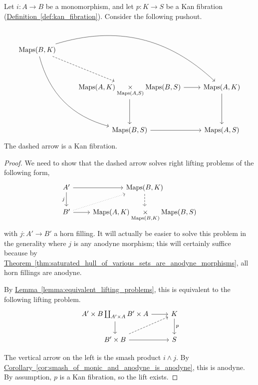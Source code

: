 \documentclass[main.tex]{subfiles}
\begin{document}
\begin{lemma}
  \label{lemma:kan_fibrations_preserved_under_dual_to_smash_product}
  Let $i\colon A \to B$ be a monomorphism, and let $p\colon K \to S$ be a Kan fibration (\hyperref[def:kan_fibration]{Definition~\ref*{def:kan_fibration}}). Consider the following pushout.
  \begin{equation*}
    \begin{tikzcd}[row sep=huge]
      \Maps(B, K)
      \arrow[rrd, bend left]
      \arrow[rdd, bend right]
      \arrow[rd, dashed]
      \\
      & \Maps(A, K) \underset{\Maps(A, S)}{\times} \Maps(B, S)
      \arrow[r]
      \arrow[d]
      & \Maps(A, K)
      \arrow[d]
      \\
      & \Maps(B, S)
      \arrow[r]
      & \Maps(A, S)
    \end{tikzcd}
  \end{equation*}
  The dashed arrow is a Kan fibration.
\end{lemma}
\begin{proof}
  We need to show that the dashed arrow solves right lifting problems of the following form,
  \begin{equation*}
    \begin{tikzcd}
      A'
      \arrow[d, swap, "j"]
      \arrow[r]
      & \Maps(B, K)
      \arrow[d, dashed]
      \\
      B'
      \arrow[r,]
      \arrow[ur, dotted]
      & \Maps(A, K) \underset{\Maps(B, K)}{\times} \Maps(B, S)
    \end{tikzcd}
  \end{equation*}
  with $j\colon A' \to B'$ a horn filling. It will actually be easier to solve this problem in the generality where $j$ is any anodyne morphism; this will certainly suffice because by \hyperref[thm:saturated_hull_of_various_sets_are_anodyne_morphisms]{Theorem~\ref*{thm:saturated_hull_of_various_sets_are_anodyne_morphisms}}, all horn fillings are anodyne.

  By \hyperref[lemma:equivalent_lifting_problems]{Lemma~\ref*{lemma:equivalent_lifting_problems}}, this is equivalent to the following lifting problem.
  \begin{equation*}
    \begin{tikzcd}
      A' \times B \coprod_{A' \times A} B' \times A
      \arrow[r]
      \arrow[d]
      & K
      \arrow[d, "p"]
      \\
      B' \times B
      \arrow[r]
      \arrow[ur, dashed]
      & S
    \end{tikzcd}
  \end{equation*}

  The vertical arrow on the left is the smash product $i \wedge j$. By \hyperref[cor:smash_of_monic_and_anodyne_is_anodyne]{Corollary~\ref*{cor:smash_of_monic_and_anodyne_is_anodyne}}, this is anodyne. By assumption, $p$ is a Kan fibration, so the lift exists.
\end{proof}
\end{document}
